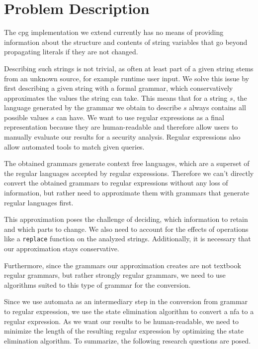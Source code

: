 \chapter{Problem Description}
\label{chapter:ProblemDescription}

The \ac{cpg} implementation we extend currently has no means of providing information about the structure and contents of string variables that go beyond propagating literals if they are not changed.

Describing such strings is not trivial, as often at least part of a given string stems from an unknown source, for example runtime user input.
We solve this issue by first describing a given string with a formal grammar, which conservatively approximates the values the string can take.
This means that for a string $s$, the language generated by the grammar we obtain to describe $s$ always contains all possible values $s$ can have.
We want to use regular expressions as a final representation because they are human-readable and therefore allow users to manually evaluate our results for a security analysis. Regular expressions also allow automated tools to match given queries. 

The obtained grammars generate context free languages, which are a superset of the regular languages accepted by regular expressions. Therefore we can't directly convert the obtained grammars to regular expressions without any loss of information, but rather need to approximate them with grammars that generate regular languages first.

This approximation poses the challenge of deciding, which information to retain and which parts to change. We also need to account for the effects of operations like a \lstinline|replace| function on the analyzed strings. Additionally, it is necessary that our approximation stays conservative.

Furthermore, since the grammars our approximation creates are not textbook regular grammars, but rather strongly regular grammars, we need to use algorithms suited to this type of grammar for the conversion.

Since we use automata as an intermediary step in the conversion from grammar to regular expression, we use the state elimination algorithm \cite{brzozowksi_mccluskey} to convert a \ac{nfa} to a regular expression. As we want our results to be human-readable, we need to minimize the length of the resulting regular expression by optimizing the state elimination algorithm.
\clearpage
To summarize, the following research questions are posed.


